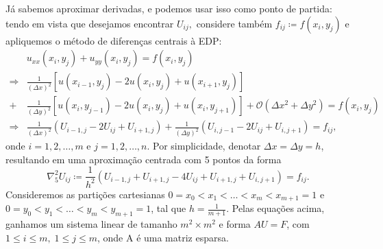 \documentclass[../differential_methods.tex]{subfiles}
\begin{document}
Já sabemos aproximar derivadas, e podemos usar isso como ponto de partida: tendo em vista que desejamos encontrar \(U_{ij},\) considere também \(f_{ij}\coloneqq f(x_{i}, y_{j})\) e apliquemos o método de diferenças centrais à EDP:
\begin{align*}
	            & u_{xx}(x_{i}, y_{j})+u_{yy}(x_{i}, y_{j})=f(x_{i}, y_{j})                                                                             \\
	\Rightarrow & \frac{1}{(\Delta x)^{2}}[u(x_{i-1}, y_{j})-2u(x_{i}, y_{j})+u(x_{i+1}, y_{j})]                                                        \\
	+           & \frac{1}{(\Delta y)^{2}}[u(x_{i}, y_{j-1})-2u(x_{i}, y_{j})+u(x_{i}, y_{j+1})]+\mathcal{O}(\Delta x^{2}+\Delta y^{2})=f(x_{i}, y_{j}) \\
	\Rightarrow & \frac{1}{(\Delta x)^{2}}(U_{i-1, j}-2U_{ij}+U_{i+1, j})+\frac{1}{(\Delta y)^{2}}(U_{i, j-1}-2U_{ij}+ U_{i, j+1})=f_{ij},
\end{align*}
onde \(i=1,2,\dotsc ,m\) e \(j=1,2,\dotsc , n\). Por simplicidade, denotar \(\Delta x = \Delta y = h\), resultando em uma aproximação centrada com 5 pontos da forma
\[
	\nabla_{5}^{2}U_{ij} \coloneqq \frac{1}{h^{2}}(U_{i-1, j}+U_{i+1, j}-4U_{ij}+U_{i+1, j}+U_{i, j+1})=f_{ij}.
\]
Consideremos as partições cartesianas \(0=x_{0}<x_1<\dotsc <x_{m}<x_{m+1}=1\) e \(0=y_{0}<y_1<\dotsc <y_{m}<y_{m+1}=1\), tal que \(h=\frac{1}{m+1}\).
Pelas equações acima, ganhamos um sistema linear de tamanho \(m^{2}\times m^{2}\) e forma \(A U = F\), com \(1\leq i\leq m,\; 1\leq j\leq m\), onde A é uma matriz esparsa.
\end{document}
